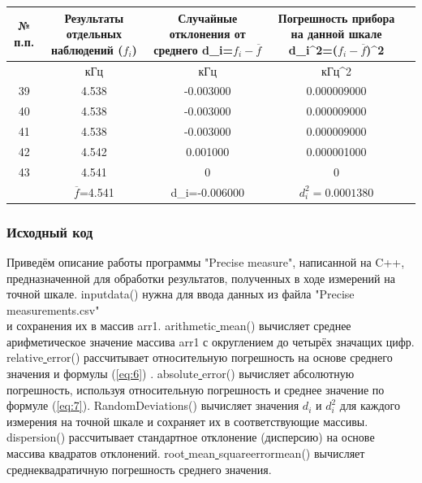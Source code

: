 \begin{center}
\begin{table}[H]
\centering

\label{tabl:11}
\begin{tabular}{|c|c|c|c|c|}
\hline
\begin{minipage}{7mm}
    № п.п. 
\end{minipage}&
\begin{minipage}{5cm}
    Результаты отдельных наблюдений ($f_i$)
\end{minipage} &
\begin{minipage}{5cm}
    Случайные отклонения от среднего d_i=$f_i-\overline{f}$
\end{minipage} &
\begin{minipage}{5cm}
    Погрешность прибора на данной шкале d_i^2=($f_i-$$\overline{f}$)^2
\end{minipage}\\
\hline
{}&кГц&кГц&кГц^2\\
\hline
39 &  4.538  &  -0.003000 & 0.000009000 \\
40 &  4.538  &  -0.003000 & 0.000009000 \\
41 &  4.538  &  -0.003000 & 0.000009000 \\
42 &  4.542  &  0.001000 & 0.000001000 \\
43 &  4.541  &  0 & 0 \\
\hline
   &  $\overline{f}$=4.541 & d_i=-0.006000 & $d_i^2=0.0001380$\\
\hline
\end{tabular}
\end{table}
\end{center}
\subsubsection{Исходный код}
Приведём описание работы программы "Precise measure", написанной на C++, предназначенной для обработки результатов, полученных в ходе измерений на точной шкале. 
 inputdata() нужна для ввода данных из файла "Precise measurements.csv" \\и сохранения их в массив arr1.
 arithmetic\underline{ }mean() вычисляет среднее арифметическое значение массива arr1 с округлением до четырёх значащих цифр.
 relative\underline{ }error() рассчитывает относительную погрешность на основе среднего значения и формулы (\ref{eq:6}) .
 absolute\underline{ }error() вычисляет абсолютную погрешность, используя относительную погрешность и среднее значение по формуле (\ref{eq:7}).
 RandomDeviations() вычисляет значения $d_i$ и $d_i^2$ для каждого измерения на точной шкале и сохраняет их в соответствующие массивы.
 dispersion() рассчитывает стандартное отклонение (дисперсию) на основе массива квадратов отклонений.
 root\underline{ }mean\underline{ }square\underline{}error\underline{}mean() вычисляет среднеквадратичную погрешность среднего значения.

